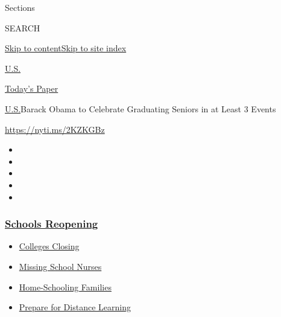 Sections

SEARCH

\protect\hyperlink{site-content}{Skip to
content}\protect\hyperlink{site-index}{Skip to site index}

\href{https://www.nytimes3xbfgragh.onion/section/us}{U.S.}

\href{https://myaccount.nytimes3xbfgragh.onion/auth/login?response_type=cookie\&client_id=vi}{}

\href{https://www.nytimes3xbfgragh.onion/section/todayspaper}{Today's
Paper}

\href{/section/us}{U.S.}\textbar{}Barack Obama to Celebrate Graduating
Seniors in at Least 3 Events

\url{https://nyti.ms/2KZKGBz}

\begin{itemize}
\item
\item
\item
\item
\item
\end{itemize}

\hypertarget{schools-reopening}{%
\subsubsection{\texorpdfstring{\href{https://www.nytimes3xbfgragh.onion/spotlight/schools-reopening?name=styln-coronavirus-schools-reopening\&region=TOP_BANNER\&variant=undefined\&block=storyline_menu_recirc\&action=click\&pgtype=Article\&impression_id=51cb38c0-e3b5-11ea-9f8d-273481ab7f61}{Schools
Reopening}}{Schools Reopening}}\label{schools-reopening}}

\begin{itemize}
\tightlist
\item
  \href{https://www.nytimes3xbfgragh.onion/2020/08/19/us/colleges-closing-covid.html?name=styln-coronavirus-schools-reopening\&region=TOP_BANNER\&variant=undefined\&block=storyline_menu_recirc\&action=click\&pgtype=Article\&impression_id=51cb38c1-e3b5-11ea-9f8d-273481ab7f61}{Colleges
  Closing}
\item
  \href{https://www.nytimes3xbfgragh.onion/2020/08/20/us/schools-reopening-nurses-covid.html?name=styln-coronavirus-schools-reopening\&region=TOP_BANNER\&variant=undefined\&block=storyline_menu_recirc\&action=click\&pgtype=Article\&impression_id=51cb38c2-e3b5-11ea-9f8d-273481ab7f61}{Missing
  School Nurses}
\item
  \href{https://www.nytimes3xbfgragh.onion/2020/08/18/parenting/homeschool-families.html?name=styln-coronavirus-schools-reopening\&region=TOP_BANNER\&variant=undefined\&block=storyline_menu_recirc\&action=click\&pgtype=Article\&impression_id=51cb5fd0-e3b5-11ea-9f8d-273481ab7f61}{Home-Schooling
  Families}
\item
  \href{https://www.nytimes3xbfgragh.onion/2020/08/05/parenting/parents-distance-learning.html?name=styln-coronavirus-schools-reopening\&region=TOP_BANNER\&variant=undefined\&block=storyline_menu_recirc\&action=click\&pgtype=Article\&impression_id=51cb5fd1-e3b5-11ea-9f8d-273481ab7f61}{Prepare
  for Distance Learning}
\end{itemize}

